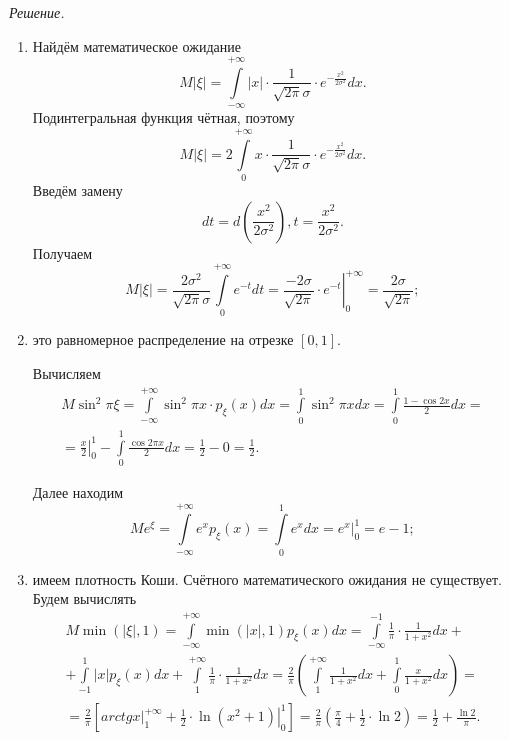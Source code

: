 \textit{Решение.}
\begin{enumerate}[label=\alph*)]
\item Найдём математическое ожидание
$$M \left| \xi \right| =
\int \limits_{- \infty }^{+ \infty } \left| x \right| \cdot \frac{1}{ \sqrt{2 \pi } \sigma } \cdot e^{- \frac{x^2}{2 \sigma^2}}dx.$$
Подинтегральная функция чётная, поэтому
$$M \left| \xi \right| =
2 \int \limits_0^{+ \infty } x \cdot \frac{1}{ \sqrt{2 \pi } \sigma } \cdot e^{- \frac{x^2}{2 \sigma^2}}dx.$$
Введём замену
$$dt = d \left( \frac{x^2}{2 \sigma^2} \right),
t = \frac{x^2}{2 \sigma^2}.$$
Получаем
$$M \left| \xi \right| =
\frac{2 \sigma^2}{ \sqrt{2 \pi } \sigma } \int \limits_0^{+ \infty } e^{-t} dt =
\left. \frac{-2 \sigma }{ \sqrt{2 \pi }} \cdot e^{-t} \right|_0^{+ \infty } =
\frac{2 \sigma }{ \sqrt{2 \pi }};$$
\item это равномерное распределение на отрезке $ \left[ 0, 1 \right] $.

Вычисляем
\begin{equation*}
\begin{split}
M \sin^2 \pi \xi =
\int \limits_{- \infty }^{+ \infty } \sin^2 \pi x \cdot p_{ \xi } \left( x \right) dx =
\int \limits_0^1 \sin^2 \pi x dx =
\int \limits_0^1 \frac{1 - \cos 2x}{2} dx = \\
= \left. \frac{x}{2} \right|_0^1 - \int \limits_0^1 \frac{ \cos 2 \pi x}{2} dx =
\frac{1}{2} - 0 =
\frac{1}{2}.
\end{split}
\end{equation*}

Далее находим
$$Me^{ \xi } =
\int \limits_{- \infty }^{+ \infty } e^x p_{ \xi } \left( x \right) =
\int \limits_0^1 e^x dx =
\left. e^x \right|_0^1 =
e - 1;$$
\item имеем плотность Коши.
Счётного математического ожидания не существует.
Будем вычислять
\begin{equation*}
\begin{split}
M \min \left( \left| \xi \right|, 1 \right) =
\int \limits_{- \infty }^{+ \infty } \min \left( \left| x \right|, 1 \right) p_{ \xi } \left( x \right) dx =
\int \limits_{- \infty }^{-1} \frac{1}{ \pi } \cdot \frac{1}{1+x^2} dx + \\
+ \int \limits_{-1}^1 \left| x \right| p_{ \xi } \left( x \right) dx +
\int \limits_1^{+ \infty } \frac{1}{ \pi } \cdot \frac{1}{1+x^2} dx =
\frac{2}{ \pi } \left( \int \limits_1^{+ \infty } \frac{1}{1+x^2} dx + \int \limits_0^1 \frac{x}{1+x^2} dx \right) = \\
= \frac{2}{ \pi } \left[ \left. arctg x \right|_1^{+ \infty } + \left. \frac{1}{2} \cdot \ln \left( x^2 + 1 \right) \right|_0^1 \right] =
\frac{2}{ \pi } \left( \frac{ \pi }{4} + \frac{1}{2} \cdot \ln 2 \right) =
\frac{1}{2} + \frac{ \ln 2}{ \pi }.
\end{split}
\end{equation*}
\end{enumerate}

